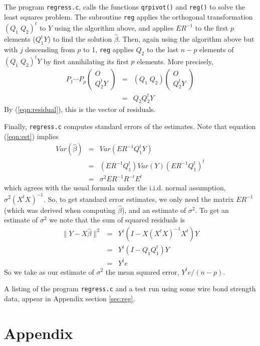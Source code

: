 \documentclass{article}
\begin{document}
The program {\tt regress.c}, calls the functions {\tt qrpivot()} and {\tt reg()} to
  solve the least squares problem.  The subroutine {\tt reg} applies
  the orthogonal transformation $(Q_1\; Q_2)^t$ to $Y$ using the algorithm
  above, and applies $ER^{-1}$ to the first $p$ elements ($Q_1^t Y$) 
to find the solution $\hat \beta$.  Then, again using the algorithm
  above but with $j$ descending from $p$ to 1, {\tt reg} applies
$Q_2$ to the last $n-p$ elements of $(Q_1 \; Q_2)^tY$ by first annihilating its
  first $p$ elements.  More precisely,
  \begin{eqnarray*}
P_1\cdots P_p \left(\begin{array}{c}O\\Q_2^tY \end{array}\right) & = &
\left(Q_1 \; Q_2\right)\left(\begin{array}{c}O\\Q_2^tY \end{array}\right)\\
& = & Q_2Q_2^tY
\end{eqnarray*}
By (\ref{eqn:residual}), this is the vector of residuals.

Finally, {\tt regress.c} computes standard errors
of the estimates.  Note that equation (\ref{eqn:est}) implies
\begin{eqnarray*}
Var(\hat \beta)& =& Var(ER^{-1}Q_1^tY)\\
& = & (ER^{-1}Q_1^t)Var(Y)(ER^{-1}Q_1^t)^t\\
& = & \sigma^2 ER^{-1}R^{-t}E^t
\end{eqnarray*}
which agrees with the usual formula under the i.i.d. normal assumption, $\sigma^2(X^tX)^{-1}$.  
So, to get standard error estimates, 
we only need the matrix $ER^{-1}$ (which was derived when
computing $\hat \beta$), and an estimate of $\sigma^2$.  
To get an estimate of $\sigma^2$ we note that the sum of squared residuals is
\begin{eqnarray*}
\|Y - X\hat \beta\|^2 & =&  Y^t(I - X(X^tX)^{-1}X^t)Y \\
& = & Y^t(I - Q_1Q_1^t)Y\\
 & = & Y^te
\end{eqnarray*}
So we take as our estimate of $\sigma^2$ the mean squared error,
$Y^te/(n-p)$.

A listing of the program {\tt regress.c} and a test run using some
wire bond strength data, appear in Appendix section \ref{sec:reg}.
\pagebreak
\section{Appendix}
\end{document}
